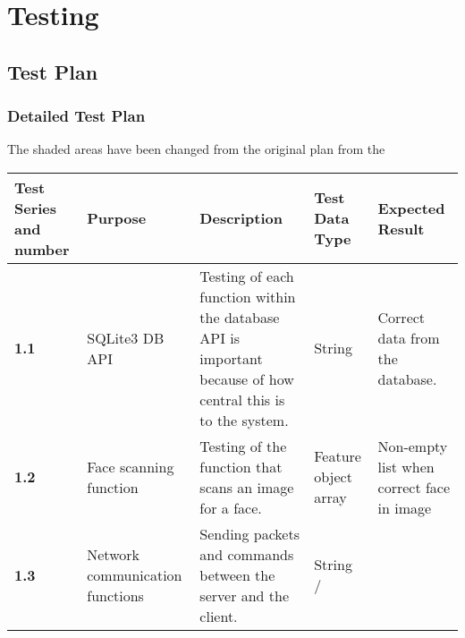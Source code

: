 \documentclass[12pt,a4paper]{report}
\begin{document}
\chapter{Testing}

\section{Test Plan}
\subsection{Detailed Test Plan}
The shaded areas have been changed from the original plan from the 

\tablehead{}
\begin{supertabular}{|m{2.259cm}|m{2.375cm}|m{3.936cm}|m{1.416cm}|m{4.6860003cm}|}
\hline
\bfseries Test Series and number &
\bfseries Purpose &
\bfseries Description &
\bfseries Test Data Type &
\bfseries Expected Result\\\hline
\bfseries 1.1 &
SQLite3 DB API &
Testing of each function within the database API is important because of how central this is to the system. &
String &
Correct data from the database.\\\hline
\bfseries 1.2 &
Face scanning function &
Testing of the function that scans an image for a face. &
Feature object array &
Non-empty list when correct face in image\\\hline
\bfseries 1.3 &
Network communication functions &
Sending packets and commands between the server and the client. &
String /


\end{supertabular}
\end{document}
